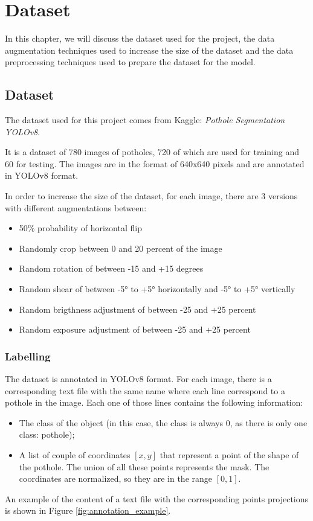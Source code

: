 \chapter{Dataset}

In this chapter, we will discuss the dataset used for the project, the data augmentation techniques used to increase the size of the dataset and the data preprocessing techniques used to prepare the dataset for the model.


\section*{Dataset}
The dataset used for this project comes from Kaggle: \textit{Pothole Segmentation YOLOv8}. 

It is a dataset of 780 images of potholes, 720 of which are used for training and 60 for testing. 
The images are in the format of 640x640 pixels and are annotated in YOLOv8 format. 

In order to increase the size of the dataset, for each image, there are 3 versions with different augmentations between:
\begin{itemize}
    \item 50\% probability of horizontal flip
    \item Randomly crop between 0 and 20 percent of the image
    \item Random rotation of between -15 and +15 degrees
    \item Random shear of between -5° to +5° horizontally and -5° to +5° vertically
    \item Random brigthness adjustment of between -25 and +25 percent
    \item Random exposure adjustment of between -25 and +25 percent
\end{itemize}



\subsection*{Labelling}
The dataset is annotated in YOLOv8 format.
For each image, there is a corresponding text file with the same name where each line correspond to a pothole in the image. Each one of those lines contains the following information:
\begin{itemize}
    \item The class of the object (in this case, the class is always 0, as there is only one class: pothole);
    \item A list of couple of coordinates $[x, y]$ that represent a point of the shape of the pothole. The union of all these points represents the mask. The coordinates are normalized, so they are in the range $[0, 1]$.
\end{itemize}
An example of the content of a text file with the corresponding points projections is shown in Figure \ref{fig:annotation_example}.


